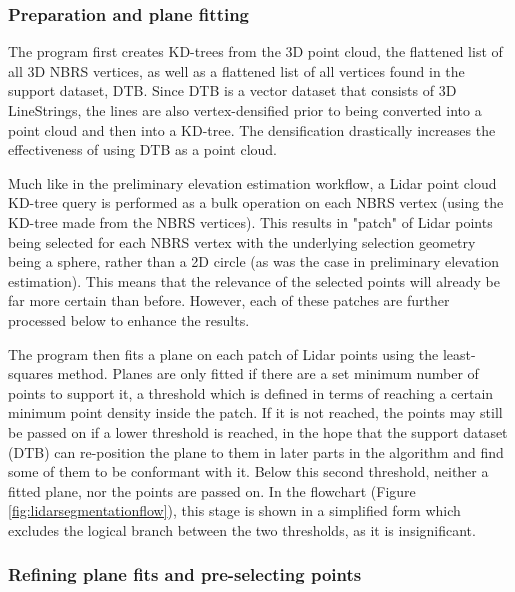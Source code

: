 \subsubsection{Preparation and plane fitting}

The program first creates KD-trees from the 3D point cloud, the flattened list of all 3D NBRS vertices, as well as a flattened list of all vertices found in the support dataset, DTB. Since DTB is a vector dataset that consists of 3D LineStrings, the lines are also vertex-densified prior to being converted into a point cloud and then into a KD-tree. The densification drastically increases the effectiveness of using DTB as a point cloud.

Much like in the preliminary elevation estimation workflow, a Lidar point cloud KD-tree query is performed as a bulk operation on each NBRS vertex (using the KD-tree made from the NBRS vertices). This results in "patch" of Lidar points being selected for each NBRS vertex with the underlying selection geometry being a sphere, rather than a 2D circle (as was the case in preliminary elevation estimation). This means that the relevance of the selected points will already be far more certain than before. However, each of these patches are further processed below to enhance the results.

The program then fits a plane on each patch of Lidar points using the least-squares method. Planes are only fitted if there are a set minimum number of points to support it, a threshold which is defined in terms of reaching a certain minimum point density inside the patch. If it is not reached, the points may still be passed on if a lower threshold is reached, in the hope that the support dataset (DTB) can re-position the plane to them in later parts in the algorithm and find some of them to be conformant with it. Below this second threshold, neither a fitted plane, nor the points are passed on. In the flowchart (Figure \ref{fig:lidarsegmentationflow}), this stage is shown in a simplified form which excludes the logical branch between the two thresholds, as it is insignificant.

\subsubsection{Refining plane fits and pre-selecting points}

